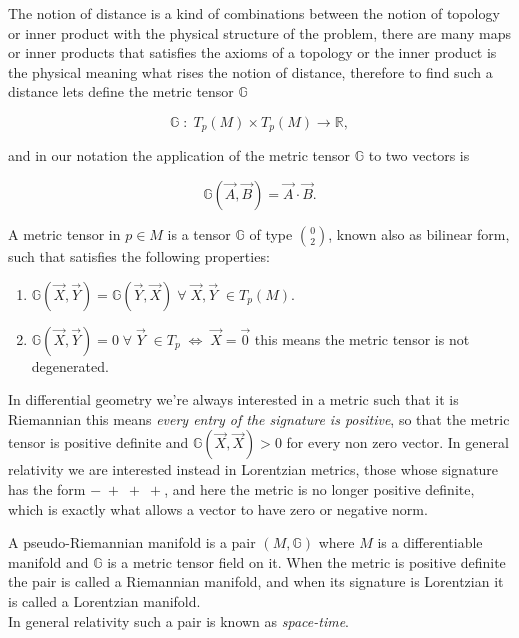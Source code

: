         The notion of distance is a kind of combinations between the notion of topology or inner product with the physical structure of the problem, there are many maps or inner products that satisfies the axioms of a topology or the inner product is the physical meaning what rises the notion of distance, therefore to find such a distance lets define the metric tensor $\mathbb{G}$

        \begin{equation}
            \mathbb{G}\;:\; T_p(M)\times T_p(M) \rightarrow \mathbb{R},
        \end{equation}

        and in our notation the application of the metric tensor $\mathbb{G}$ to two vectors is

        \begin{equation}
            \mathbb{G}(\Vec{A},\Vec{B}) = \Vec{A}\cdot\Vec{B}.
        \end{equation}

        \begin{myDef}
            A metric tensor in $p\in M$ is a tensor $\mathbb{G}$ of type $\binom{0}{2}$, known also as bilinear form, such that satisfies the following properties:

            \begin{enumerate}
                \item $\mathbb{G}(\Vec{X},\Vec{Y}) = \mathbb{G}(\Vec{Y},\Vec{X}) \;\forall \; \Vec{X},\Vec{Y}\; \in T_p(M).$

                \item $\mathbb{G}(\Vec{X},\Vec{Y}) = 0 \;\forall \;\Vec{Y}\;\in T_p \; \Leftrightarrow \; \Vec{X} = \Vec{0}$ this means the metric tensor is not degenerated.
            \end{enumerate}
        \end{myDef}

        In differential geometry we're always interested in a metric such that it is Riemannian this means \textit{every entry of the signature is positive}, so that the metric tensor is positive definite and $\mathbb{G}(\Vec{X},\Vec{X})>0$ for every non zero vector. In general relativity we are interested instead in Lorentzian metrics, those whose signature has the form $-\;+\;+\;+$, and here the metric is no longer positive definite, which is exactly what allows a vector to have zero or negative norm.

        \begin{myDef}
            A pseudo-Riemannian manifold is a pair $(M,\mathbb{G})$ where $M$ is a differentiable manifold and $\mathbb{G}$ is a metric tensor field on it. When the metric is positive definite the pair is called a Riemannian manifold, and when its signature is Lorentzian it is called a Lorentzian manifold.\\

            In general relativity such a pair is known as \textit{space-time}.
        \end{myDef}

